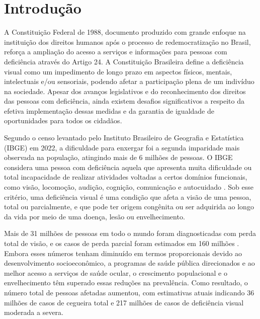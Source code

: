 \chapter{Introdução}
\label{cap:introducao}


A Constituição Federal de 1988, documento produzido com grande enfoque na instituição dos direitos humanos após o processo de redemocratização no Brasil, reforça a ampliação do acesso a serviços e informações para pessoas com deficiência através do Artigo 24. A Constituição Brasileira define a deficiência visual como um impedimento de longo prazo em aspectos físicos, mentais, intelectuais e/ou sensoriais, podendo afetar a participação plena de um indivíduo na sociedade. Apesar dos avanços legislativos e do reconhecimento dos direitos das pessoas com deficiência, ainda existem desafios significativos a respeito da efetiva implementação dessas medidas e da garantia de igualdade de oportunidades para todos os cidadãos.

Segundo o censo levantado pelo Instituto Brasileiro de Geografia e Estatística (IBGE) em 2022, a dificuldade para enxergar foi a segunda imparidade mais observada na população, atingindo mais de 6 milhões de pessoas. O IBGE considera uma pessoa com deficiência aquela que apresenta muita dificuldade ou total incapacidade de realizar atividades voltadas a certos domínios funcionais, como visão, locomoção, audição, cognição, comunicação e autocuidado   \cite{ibge}. Sob esse critério, uma deficiência visual é uma condição que afeta a visão de uma pessoa, total ou parcialmente, e que pode ter origem congênita ou ser adquirida ao longo da vida por meio de uma doença, lesão ou envelhecimento.

Mais de 31 milhões de pessoas em todo o mundo foram diagnosticadas com perda total de visão, e os casos de perda parcial foram estimados em 160 milhões \cite{the-lancet-global-health}. Embora esses números tenham diminuído em termos proporcionais devido ao desenvolvimento socioeconômico, a programas de saúde pública direcionados e ao melhor acesso a serviços de saúde ocular, o crescimento populacional e o envelhecimento têm superado essas reduções na prevalência. Como resultado, o número total de pessoas afetadas aumentou, com estimativas atuais indicando 36 milhões de casos de cegueira total e 217 milhões de casos de deficiência visual moderada a severa.

